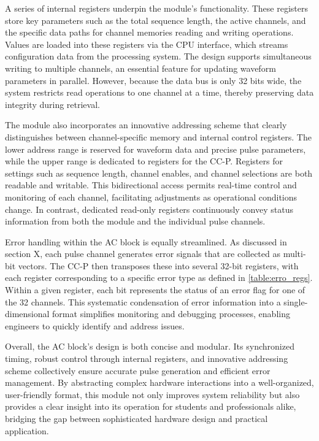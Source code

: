 A series of internal registers underpin the module's functionality. These registers store key parameters such as the total sequence length, the active channels, and the specific data paths for channel memories reading and writing operations. Values are loaded into these registers via the CPU interface, which streams configuration data from the processing system. The design supports simultaneous writing to multiple channels, an essential feature for updating waveform parameters in parallel. However, because the data bus is only 32 bits wide, the system restricts read operations to one channel at a time, thereby preserving data integrity during retrieval.

The module also incorporates an innovative addressing scheme that clearly distinguishes between channel-specific memory and internal control registers. The lower address range is reserved for waveform data and precise pulse parameters, while the upper range is dedicated to registers for the CC-P. Registers for settings such as sequence length, channel enables, and channel selections are both readable and writable. This bidirectional access permits real-time control and monitoring of each channel, facilitating adjustments as operational conditions change. In contrast, dedicated read-only registers continuously convey status information from both the module and the individual pulse channels.

Error handling within the AC block is equally streamlined. As discussed in section X, each pulse channel generates error signals that are collected as multi-bit vectors. The CC-P then transposes these into several 32-bit registers, with each register corresponding to a specific error type as defined in \autoref{table:erro_regs}. Within a given register, each bit represents the status of an error flag for one of the 32 channels. This systematic condensation of error information into a single-dimensional format simplifies monitoring and debugging processes, enabling engineers to quickly identify and address issues.

Overall, the AC block's design is both concise and modular. Its synchronized timing, robust control through internal registers, and innovative addressing scheme collectively ensure accurate pulse generation and efficient error management. By abstracting complex hardware interactions into a well-organized, user-friendly format, this module not only improves system reliability but also provides a clear insight into its operation for students and professionals alike, bridging the gap between sophisticated hardware design and practical application.

